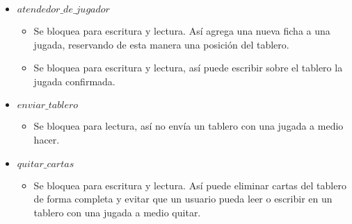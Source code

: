 \begin{itemize}

\item $atendedor\_de\_jugador$

\begin{itemize}
\item Se bloquea para escritura y lectura. Así agrega una nueva ficha a una jugada, reservando de esta manera una posición del tablero.

\item Se bloquea para escritura y lectura, así puede escribir sobre el tablero la jugada confirmada.

\end{itemize}

\item $enviar\_tablero$

\begin{itemize}

\item Se bloquea para lectura, así no envía un tablero con una jugada a medio hacer.

\end{itemize}

\item $quitar\_cartas$

\begin{itemize}

\item Se bloquea para escritura y lectura. Así puede eliminar cartas del tablero de forma completa y evitar que un usuario pueda leer o escribir en un tablero con una jugada a medio quitar.

\end{itemize}

\end{itemize}
